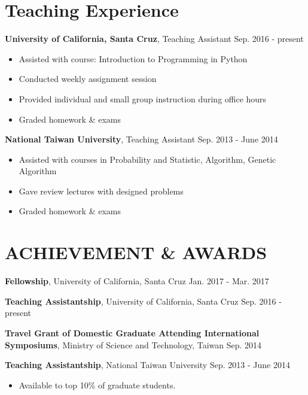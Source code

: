 \documentclass[a4paper,10pt]{article}
\begin{document}
\section{Teaching Experience}
\textbf{University of California, Santa Cruz}, Teaching Assistant  \hfill Sep. 2016 - present
    \begin{itemize}
        \item Assisted with course: Introduction to Programming in Python
        \item Conducted weekly assignment session
        \item Provided individual and small group instruction during office hours
        \item Graded homework \& exams
    \end{itemize}
\textbf{ National Taiwan University}, Teaching Assistant \hfill Sep. 2013 - June 2014
    \begin{itemize}
        \item Assisted with courses in Probability and Statistic, Algorithm, Genetic Algorithm
        \item Gave review lectures with designed problems
        \item Graded homework \& exams
    \end{itemize}

\section{ACHIEVEMENT \& AWARDS}

\textbf{Fellowship}, University of California, Santa Cruz \hfill Jan. 2017 - Mar. 2017

\textbf{Teaching Assistantship}, University of California, Santa Cruz \hfill Sep. 2016 - present

\textbf{Travel Grant of Domestic Graduate Attending International Symposiums}, Ministry of Science and Technology, Taiwan \hfill Sep. 2014

\textbf{Teaching Assistantship}, National Taiwan University \hfill Sep. 2013 - June 2014
\begin{itemize}
    \item Available to top 10\% of graduate students.
\end{itemize}
\end{document}
